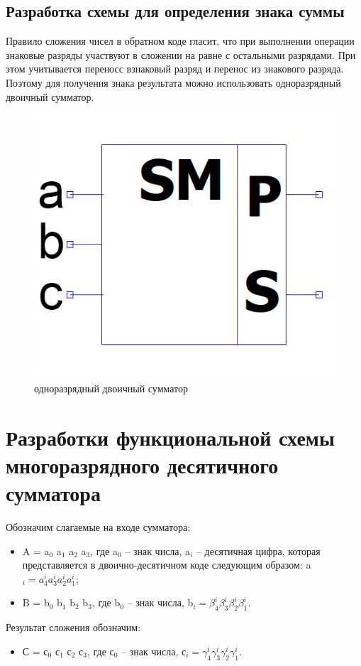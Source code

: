 \documentclass[a4paper,14pt]{article}
\begin{document}
\subsection{Разработка схемы для определения знака суммы}

Правило сложения чисел в обратном коде гласит, что при выполнении операции знаковые разряды участвуют в сложении на равне с остальными разрядами. При этом учитывается  переносс взнаковый разряд и перенос из знакового разряда. Поэтому для получения знака результата можно использовать  одноразрядный двоичный сумматор.

\begin{figure}[H]
	\centering
	\includegraphics[width=0.4\linewidth]{images/dvSum_el}
	\caption{одноразрядный двоичный сумматор}
	\label{fig:dvSum_el2}
\end{figure}

\section{Разработки функциональной схемы многоразрядного десятичного сумматора}

Обозначим слагаемые на входе сумматора:

\begin{itemize}	
	\item A = a$_0$ a$_1$ a$_2$ a$_3$, где a$_0$ -- знак числа, a$_i$ -- десятичная цифра, которая представляется в двоично-десятичном коде следующим образом:
	a$_i = a^i_4 a^i_3 a^i_2 a^i_1$;
	
	\item B = b$_0$ b$_1$ b$_2$ b$_3$, где b$_0$ -- знак числа, b$_i = \beta^i_4 \beta^i_3 \beta^i_2 \beta^i_1$.	
\end{itemize}

Результат сложения обозначим:
\begin{itemize}	
	\item С = с$_0$ с$_1$ с$_2$ с$_3$, где с$_0$ -- знак числа, с$_i = \gamma^i_4 \gamma^i_3 \gamma^i_2 \gamma^i_1$.	
\end{itemize}
\end{document}
